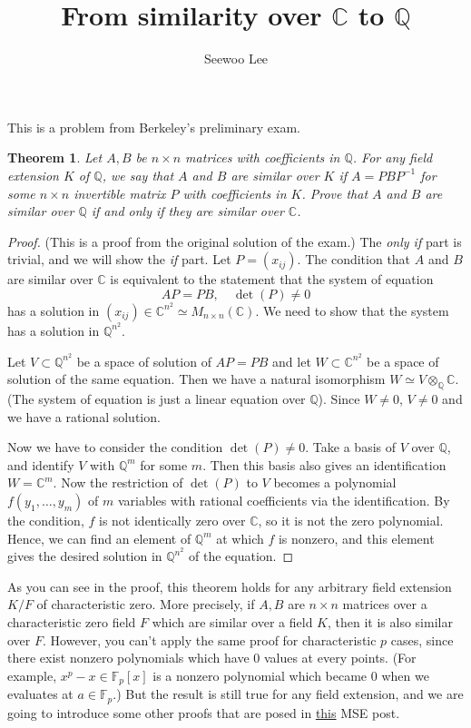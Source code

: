\documentclass{article}
\title{From similarity over $\mathbb{C}$ to $\mathbb{Q}$}
\author{Seewoo Lee}
\newtheorem{theorem}{Theorem}
\begin{document}
\maketitle
This is a problem from Berkeley's preliminary exam. 
\begin{theorem}
Let $A, B$ be $n\times n$ matrices with coefficients in $\mathbb{Q}$. For any field extension $K$ of $\mathbb{Q}$, we say that $A$ and $B$ are similar over $K$ if $A = PBP^{-1}$ for some $n\times n$ invertible matrix $P$ with coefficients in $K$. Prove that $A$ and $B$ are similar over $\mathbb{Q}$ if and only if they are similar over $\mathbb{C}$.
\end{theorem}
\begin{proof}
(This is a proof from the original solution of the exam.) The \emph{only if} part is trivial, and we will show the \emph{if} part. 
Let $P = (x_{ij})$. 
The condition that $A$ and $B$ are similar over $\mathbb{C}$ is equivalent to the statement that the system of equation 
$$
AP = PB, \quad \det(P)\neq 0
$$
has a solution in $(x_{ij})\in \mathbb{C}^{n^{2}}\simeq M_{n\times n}(\mathbb{C})$. We need to show that the system has a solution in $\mathbb{Q}^{n^{2}}$. 

Let $V\subset \mathbb{Q}^{n^{2}}$ be a space of solution of $AP=PB$ and let $W\subset \mathbb{C}^{n^{2}}$ be a space of solution of the same equation. Then we have a natural isomorphism $W\simeq V\otimes_{\mathbb{Q}}\mathbb{C}$. (The system of equation is just a linear equation over $\mathbb{Q}$).  Since $W\neq 0$, $V\neq 0$ and we have a rational solution. 

Now we have to consider the condition $\det(P)\neq 0$. Take a basis of $V$ over $\mathbb{Q}$, and identify $V$ with $\mathbb{Q}^{m}$ for some $m$. Then this basis also gives an identification $W=\mathbb{C}^{m}$. Now the restriction of $\det(P)$ to $V$ becomes a polynomial $f(y_{1}, \dots, y_{m})$ of $m$ variables with rational coefficients via the identification. By the condition, $f$ is not identically zero over $\mathbb{C}$, so it is not the zero polynomial. 
Hence, we can find an element of $\mathbb{Q}^{m}$ at which $f$ is nonzero, and this element gives the desired solution in $\mathbb{Q}^{n^{2}}$ of the equation. 
\end{proof}
As you can see in the proof, this theorem holds for any arbitrary field extension $K/F$ of characteristic zero. More precisely, if $A, B$ are $n\times n$ matrices over a characteristic zero field $F$ which are similar over a field $K$, then it is also similar over $F$. 
However, you can't apply the same proof for characteristic $p$ cases, since there exist nonzero polynomials which have 0 values at every points. (For example, $x^{p}-x\in \mathbb{F}_{p}[x]$ is a nonzero polynomial which became 0 when we evaluates at $a\in \mathbb{F}_{p}$.) 
But the result is still true for any field extension, and we are going to introduce some other proofs that are posed in \href{https://math.stackexchange.com/questions/57242/similar-matrices-and-field-extensions/57271#57271}{this} MSE post. 
\end{document}
